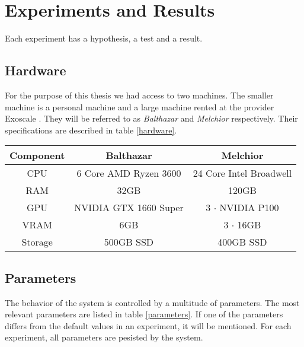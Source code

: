 \chapter{Experiments and Results}
\label{experiments-and-results}

Each experiment has a hypothesis, a test and a result.

\section{Hardware}
For the purpose of this thesis we had access to two machines. The smaller machine is a personal machine and a large machine rented at the provider Exoscale \cite{noauthor_exoscale_nodate}. They will be referred to as \textit{Balthazar} and \textit{Melchior} respectively. Their specifications are described in table \ref{hardware}.

\begin{table*}
    \begin{center}
        \begin{tabular}{ c|c|c }
            Component & Balthazar             & Melchior                \\
            \hline
            \hline
            CPU       & 6 Core AMD Ryzen 3600 & 24 Core Intel Broadwell \\
            RAM       & 32GB                  & 120GB                   \\
            GPU       & NVIDIA GTX 1660 Super & 3 $\cdot$ NVIDIA P100   \\
            VRAM      & 6GB                   & 3 $\cdot$ 16GB          \\
            Storage   & 500GB SSD             & 400GB SSD               \\
        \end{tabular}
    \end{center}
    \caption{Hardware specifications of the utilized machines}
    \label{hardware}
\end{table*}

\section{Parameters}
The behavior of the system is controlled by a multitude of parameters. The most relevant parameters are listed in table \ref{parameters}. If one of the parameters differs from the default values in an experiment, it will be mentioned. For each experiment, all parameters are pesisted by the system.

